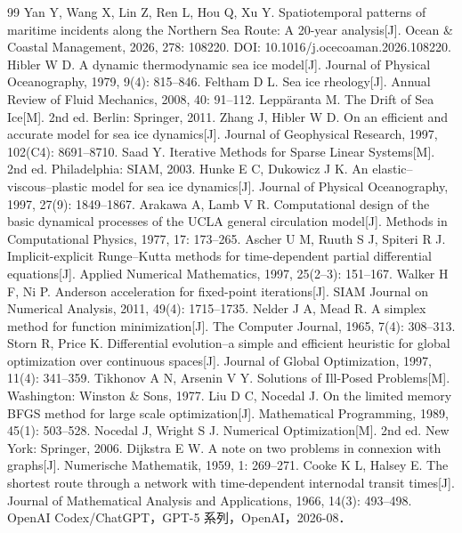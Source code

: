 \documentclass[UTF8,fontset=none]{ctexart}
\begin{document}
\begin{thebibliography}{99}
 Yan Y, Wang X, Lin Z, Ren L, Hou Q, Xu Y. Spatiotemporal patterns of maritime incidents along the Northern Sea Route: A 20-year analysis[J]. Ocean \& Coastal Management, 2026, 278: 108220. DOI: 10.1016/j.ocecoaman.2026.108220.
 Hibler W D. A dynamic thermodynamic sea ice model[J]. Journal of Physical Oceanography, 1979, 9(4): 815--846.
 Feltham D L. Sea ice rheology[J]. Annual Review of Fluid Mechanics, 2008, 40: 91--112.
 Leppäranta M. The Drift of Sea Ice[M]. 2nd ed. Berlin: Springer, 2011.
 Zhang J, Hibler W D. On an efficient and accurate model for sea ice dynamics[J]. Journal of Geophysical Research, 1997, 102(C4): 8691--8710.
 Saad Y. Iterative Methods for Sparse Linear Systems[M]. 2nd ed. Philadelphia: SIAM, 2003.
 Hunke E C, Dukowicz J K. An elastic--viscous--plastic model for sea ice dynamics[J]. Journal of Physical Oceanography, 1997, 27(9): 1849--1867.
 Arakawa A, Lamb V R. Computational design of the basic dynamical processes of the UCLA general circulation model[J]. Methods in Computational Physics, 1977, 17: 173--265.
 Ascher U M, Ruuth S J, Spiteri R J. Implicit-explicit Runge--Kutta methods for time-dependent partial differential equations[J]. Applied Numerical Mathematics, 1997, 25(2--3): 151--167.
 Walker H F, Ni P. Anderson acceleration for fixed-point iterations[J]. SIAM Journal on Numerical Analysis, 2011, 49(4): 1715--1735.
 Nelder J A, Mead R. A simplex method for function minimization[J]. The Computer Journal, 1965, 7(4): 308--313.
 Storn R, Price K. Differential evolution--a simple and efficient heuristic for global optimization over continuous spaces[J]. Journal of Global Optimization, 1997, 11(4): 341--359.
 Tikhonov A N, Arsenin V Y. Solutions of Ill-Posed Problems[M]. Washington: Winston \& Sons, 1977.
 Liu D C, Nocedal J. On the limited memory BFGS method for large scale optimization[J]. Mathematical Programming, 1989, 45(1): 503--528.
 Nocedal J, Wright S J. Numerical Optimization[M]. 2nd ed. New York: Springer, 2006.
 Dijkstra E W. A note on two problems in connexion with graphs[J]. Numerische Mathematik, 1959, 1: 269--271.
 Cooke K L, Halsey E. The shortest route through a network with time-dependent internodal transit times[J]. Journal of Mathematical Analysis and Applications, 1966, 14(3): 493--498.
 OpenAI Codex/ChatGPT，GPT-5 系列，OpenAI，2026-08．
\end{thebibliography}
\end{document}
